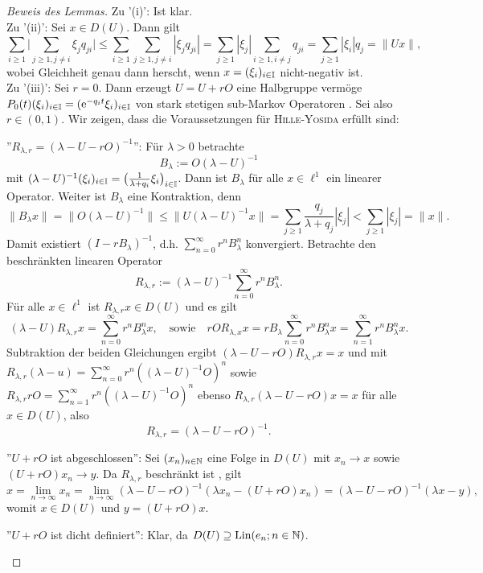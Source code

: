 \documentclass[a4paper]{paper}
\numberwithin{equation}{satz}
\begin{document}
\begin{proof}[Beweis des Lemmas] 
  Zu '(i)': Ist klar.\\
  Zu '(ii)': Sei $x\in D(U)$. Dann gilt $$\sum_{i\geq 1}\Bigg|\sum_{j\geq1, j\neq i}\xi_j q_{ji}\Bigg|\leq \sum_{i\geq 1}\sum_{j\geq1, j\neq i}|\xi_j q_{ji}|=\sum_{j\geq1}|\xi_j|\sum_{i\geq1, i\neq j}q_{ji}=\sum_{j\geq1}|\xi_i|q_j=\|Ux\|,$$ wobei Gleichheit genau dann herscht, wenn $x=(\xi_i)_{i\in\mathbb{I}}$ nicht-negativ ist.\\
  Zu '(iii)': Sei $r=0$. Dann erzeugt $U=U+rO$ eine Halbgruppe vermöge $P_0(t)(\xi_i)_{i\in\mathbb{I}}=(\text e^{-q_it}\xi_i)_{i\in\mathbb I}$ von stark stetigen sub-Markov Operatoren . Sei also $r\in(0,1)$. Wir zeigen, dass die Voraussetzungen für \textsc{Hille-Yosida} erfüllt sind:
  \begin{compactenum}
  \item ''$R_{\lambda,r}=(\lambda-U-rO)^{-1}$'': Für $\lambda >0$ betrachte 
  $$B_\lambda:=O(\lambda-U)^{-1}$$
  mit $(\lambda-U)^{-1}(\xi_i)_{i\in\mathbb{I}}=\big(\frac{1}{\lambda+q_i}\xi_i\big)_{i\in\mathbb{I}}$. Dann ist $B_\lambda$ für alle $x\in\ell^1$ ein linearer Operator. Weiter ist $B_\lambda$ eine Kontraktion, denn 
  $$\|B_\lambda x\|=\|O(\lambda-U)^{-1}\|\leq\|U(\lambda-U)^{-1}x\|=\sum_{j\geq1}\frac{q_j}{\lambda+q_j}|\xi_j|< \sum_{j\geq1}|\xi_j|=\|x\|.$$
  Damit existiert $(I-rB_\lambda)^{-1}$, d.h. $\sum_{n=0}^\infty r^n B_\lambda ^n$ konvergiert. Betrachte den beschränkten linearen Operator 
  $$R_{\lambda,r}:=(\lambda-U)^{-1}\sum_{n=0}^\infty r^n B_\lambda^n.$$ 
  Für alle $x\in\ell^1$ ist $R_{\lambda,r}x\in D(U)$ und es gilt
  $$(\lambda-U)R_{\lambda,r}x=\sum_{n=0}^\infty r^n B_\lambda^n x,\quad\text{sowie}\quad rOR_{\lambda,x}x=r B_\lambda\sum_{n=0}^\infty r^n B_\lambda^n x=\sum_{n=1}^\infty r^n B_\lambda^n x.$$
  Subtraktion der beiden Gleichungen ergibt $(\lambda-U-rO)R_{\lambda,r}x=x$ und mit $R_{\lambda,r}(\lambda-u)=\sum_{n=0}^\infty r^n((\lambda-U)^{-1}O)^n$ sowie $R_{\lambda, r}rO=\sum_{n=1}^\infty r^{n}((\lambda-U)^{-1}O)^{n}$ ebenso $R_{\lambda,r}(\lambda-U-rO)x=x$ für alle $x\in D(U)$, also 
  $$R_{\lambda,r}=(\lambda-U-rO)^{-1}.$$
  \item ''$U+rO$ ist abgeschlossen'': Sei $(x_n)_{n\in\mathbb{N}}$ eine Folge in $D(U)$ mit $x_n\to x$ sowie $(U+rO)x_n\to y$. Da $R_{\lambda,r}$ beschränkt ist , gilt   
  $$x=\lim_{n\to\infty} x_n=\lim_{n\to\infty}(\lambda-U-rO)^{-1}(\lambda x_n-(U+rO)x_n)=(\lambda-U-rO)^{-1}(\lambda x-y),$$
  womit $x\in D(U)$ und $y=(U+rO)x$.
  \item ''$U+rO$ ist dicht definiert'': Klar, da $D(U)\supseteq\text{Lin}(e_n; n\in\mathbb{N})$.

\end{compactenum}
\end{proof}
\end{document}
